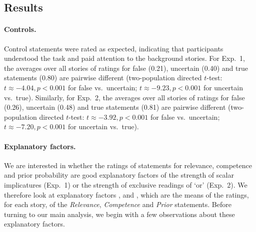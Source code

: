 \documentclass[12pt]{article}
\begin{document}
\subsection*{Results}

\paragraph{Controls.} Control statements were rated as expected, indicating that participants
understood the task and paid attention to the background stories. For Exp.~1, the averages over
all stories of ratings for false (0.21), uncertain (0.40) and true statements (0.80) are
pairwise different (two-population directed $t$-test: $t \approx - 4.04, p < 0.001$ for false
vs.~uncertain; $t \approx - 9.23, p < 0.001$ for uncertain vs.~true). Similarly, for Exp.~2,
the averages over all stories of ratings for false (0.26), uncertain (0.48) and true statements
(0.81) are pairwise different (two-population directed $t$-test: $t \approx - 3.92, p < 0.001$
for false vs.~uncertain; $t \approx - 7.20, p < 0.001$ for uncertain vs.~true).

\paragraph{Explanatory factors.} We are interested in whether the ratings of statements for
relevance, competence and prior probability are good explanatory factors of the strength of
scalar implicatures (Exp.~1) or the strength of exclusive readings of `or' (Exp.~2). We
therefore look at explanatory factors \rel, \com and \pri, which are the means of the ratings,
for each story, of the \emph{Relevance}, \emph{Competence} and \emph{Prior} statements. Before
turning to our main analysis, we begin with a few observations about these explanatory factors.
\end{document}
